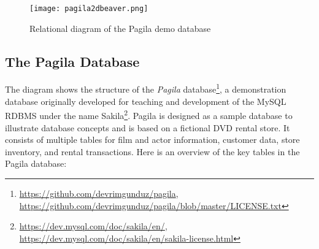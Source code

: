 \begin{figure}
\centering

\texttt{[image: pagila2dbeaver.png]}
\caption{Relational diagram of the Pagila demo database}
\label{fig:pagila}
\end{figure}


\subsection*{The Pagila Database}

The diagram shows the structure of the \emph{Pagila} database\footnote{\url{https://github.com/devrimgunduz/pagila}, \\
\url{https://github.com/devrimgunduz/pagila/blob/master/LICENSE.txt}}, a demonstration database originally developed for teaching and development of the MySQL RDBMS under the name Sakila\footnote{\url{https://dev.mysql.com/doc/sakila/en/}, \\
\url{https://dev.mysql.com/doc/sakila/en/sakila-license.html}}. Pagila is designed as a sample database to illustrate database concepts and is based on a fictional DVD rental store. It consists of multiple tables for film and actor information, customer data, store inventory, and rental transactions. Here is an overview of the key tables in the Pagila database:

